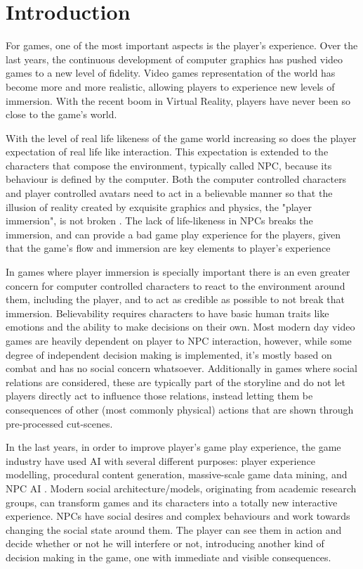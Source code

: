 \section{Introduction}
\label{sec:introduction}
For games, one of the most important aspects is the player's experience.
Over the last years, the continuous development of computer graphics has pushed video games to a new level of fidelity.
Video games representation of the world has become more and more realistic, allowing players to experience new levels of immersion.
With the recent boom in Virtual Reality, players have never been so close to the game's world.

With the level of real life likeness of the game world increasing so does the player expectation of real life like interaction.
This expectation is extended to the characters that compose the environment, typically called \ac{NPC}, because its
behaviour is defined by the computer.
Both the computer controlled characters and player controlled avatars need to act in a believable manner so that the illusion of reality created by exquisite graphics and physics, the "player immersion", is not broken \cite{thrainsson:emotion-games}.
The lack of life-likeness in \ac{NPC}s breaks the immersion, and can provide a bad game play experience for the players, given that the game's flow and immersion are key elements to player's experience \cite{ijsselsteijn:userexperience}

In games where player immersion is specially important there is an even greater concern for computer controlled characters to react to the environment around them, including the player, and to act as credible as possible to not break that immersion.
Believability requires characters to have basic human traits like emotions and the ability to make decisions on their own.
Most modern day video games are heavily dependent on player to \ac{NPC} interaction, however, while some degree of independent decision making is implemented, it's mostly based on combat and has no social concern whatsoever.
Additionally in games where social relations are considered, these are typically part of the storyline and do not let players directly act to influence those relations, instead letting them be consequences of other (most commonly physical) actions that are shown through pre-processed cut-scenes.

In the last years, in order to improve player's game play experience, the game industry have used \ac{AI} with several different purposes: player experience modelling, procedural content generation, massive-scale game data mining, and \ac{NPC} \ac{AI} \cite{yannakakis:gameairevisited}.
Modern social architecture/models, originating from academic research groups, can transform games and its characters into a totally new interactive experience.
NPCs have social desires and complex behaviours and work towards changing the social state around them.
The player can see them in action and decide whether or not he will interfere or not, introducing another kind of decision making in
the game, one with immediate and visible consequences.

